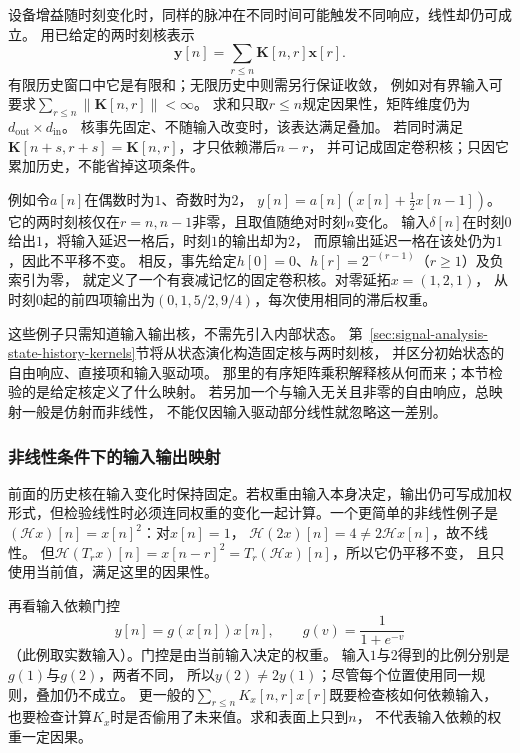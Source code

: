 设备增益随时刻变化时，同样的脉冲在不同时间可能触发不同响应，线性却仍可成立。
用已给定的两时刻核表示
\begin{equation}
  \bm y[n]=\sum_{r\leq n}\bm K[n,r]\bm x[r].
  \label{eq:signal-given-time-varying-kernel}
\end{equation}
有限历史窗口中它是有限和；无限历史中则需另行保证收敛，
例如对有界输入可要求$\sum_{r\leq n}\|\bm K[n,r]\|<\infty$。
求和只取$r\leq n$规定因果性，矩阵维度仍为
$d_{\mathrm{out}}\times d_{\mathrm{in}}$。
核事先固定、不随输入改变时，该表达满足叠加。
若同时满足$\bm K[n+s,r+s]=\bm K[n,r]$，才只依赖滞后$n-r$，
并可记成固定卷积核；只因它累加历史，不能省掉这项条件。

例如令$a[n]$在偶数时为$1$、奇数时为$2$，
$y[n]=a[n](x[n]+\tfrac12x[n-1])$。
它的两时刻核仅在$r=n,n-1$非零，且取值随绝对时刻$n$变化。
输入$\delta[n]$在时刻$0$给出$1$，将输入延迟一格后，时刻$1$的输出却为$2$，
而原输出延迟一格在该处仍为$1$，因此不平移不变。
相反，事先给定$h[0]=0$、$h[r]=2^{-(r-1)}$（$r\geq1$）及负索引为零，
就定义了一个有衰减记忆的固定卷积核。对零延拓$x=(1,2,1)$，
从时刻$0$起的前四项输出为$(0,1,5/2,9/4)$，每次使用相同的滞后权重。

这些例子只需知道输入输出核，不需先引入内部状态。
第~\ref{sec:signal-analysis-state-history-kernels}节将从状态演化构造固定核与两时刻核，
并区分初始状态的自由响应、直接项和输入驱动项。
那里的有序矩阵乘积解释核从何而来；本节检验的是给定核定义了什么映射。
若另加一个与输入无关且非零的自由响应，总映射一般是仿射而非线性，
不能仅因输入驱动部分线性就忽略这一差别。

\subsubsection{非线性条件下的输入输出映射}

前面的历史核在输入变化时保持固定。若权重由输入本身决定，输出仍可写成加权
形式，但检验线性时必须连同权重的变化一起计算。一个更简单的非线性例子是$(\mathcal Hx)[n]=x[n]^2$：对$x[n]=1$，
$\mathcal H(2x)[n]=4\neq2\mathcal Hx[n]$，故不线性。
但$\mathcal H(T_rx)[n]=x[n-r]^2=T_r(\mathcal Hx)[n]$，所以它仍平移不变，
且只使用当前值，满足这里的因果性。

再看输入依赖门控
\[
  y[n]=g(x[n])x[n],\qquad g(v)=\frac1{1+e^{-v}}
\]
（此例取实数输入）。门控是由当前输入决定的权重。
输入$1$与$2$得到的比例分别是$g(1)$与$g(2)$，两者不同，
所以$y(2)\neq2y(1)$；尽管每个位置使用同一规则，叠加仍不成立。
更一般的$\sum_{r\leq n}K_x[n,r]x[r]$既要检查核如何依赖输入，
也要检查计算$K_x$时是否偷用了未来值。求和表面上只到$n$，
不代表输入依赖的权重一定因果。

